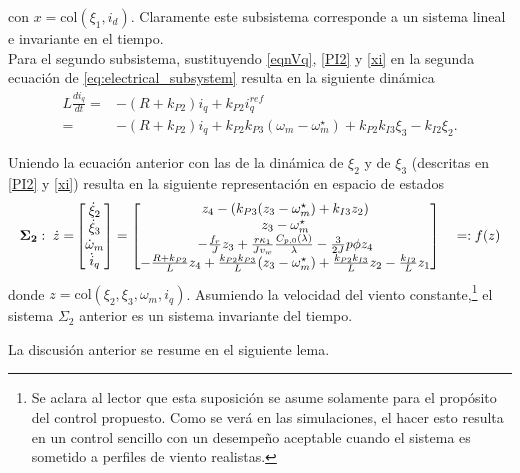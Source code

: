  con $x=\mathrm{col}(\xi_1,i_d)$. Claramente este subsistema corresponde a un sistema lineal e invariante en el tiempo. \\

Para el segundo subsistema, sustituyendo \eqref{eqnVq}, \eqref{PI2} y \eqref{xi} en la segunda ecuación de  \eqref{eq:electrical_subsystem}  resulta en la siguiente dinámica
\begin{align*}
    L\frac{di_q}{dt} =& -(R+k_{P2})i_q + k_{P2}i_q^{ref} \\
    =&-(R+k_{P2})i_q  + k_{P2}k_{P3}(\omega_m - \omega_m^\star) + k_{P2}k_{I3}\xi_3 - k_{I2}\xi_2.
\end{align*}

Uniendo la ecuación anterior con las de la dinámica de $\xi_2$ y de $\xi_3$ (descritas en  \eqref{PI2} y 
\eqref{xi}) resulta en la siguiente representación en espacio de estados
\begin{equation}\label{eq:sigma_2}
\resizebox{\textwidth}{!}{$
\mathbf{\Sigma_2:}\;\;\begin{aligned}
	\dot z=& \begin{bmatrix}
    \dot{\xi}_2 \\
    \dot{\xi}_3 \\
    \dot{\omega}_m \\
    \dot{i}_q
    \end{bmatrix} = \begin{bmatrix}
    z_4 - (k_{P3}(z_3 - \omega^\star_m) + k_{I3}z_2) \\
    z_3 - \omega^\star_m \\
    -\frac{f_r}{J}z_3 + \frac{r\kappa_1}{Jv_w}\frac{C_{p,0}(\lambda)}{\lambda} - \frac{3}{2J}p\phi z_4 \\
    -\frac{R+k_{P2}}{L}z_4 + \frac{k_{P2}k_{P3}}{L}(z_3 - \omega^\star_m) + \frac{k_{P2}k_{I3}}{L}z_2 - \frac{k_{I2}}{L}z_1
    \end{bmatrix}
\end{aligned}=:f(z)
$}
\end{equation}
donde $z=\mathrm{col}(\xi_2,\xi_3,\omega_m,i_q)$. Asumiendo la velocidad del 
viento constante,\footnote{Se aclara al lector que esta suposición se asume solamente para el propósito del control 
propuesto. Como se verá en las simulaciones, el hacer esto resulta en un control sencillo con un desempeño aceptable 
cuando el sistema es sometido a perfiles de viento realistas.} el sistema $\Sigma_2$ anterior es un sistema invariante del tiempo. 

La discusión anterior se resume en el siguiente lema.\\


